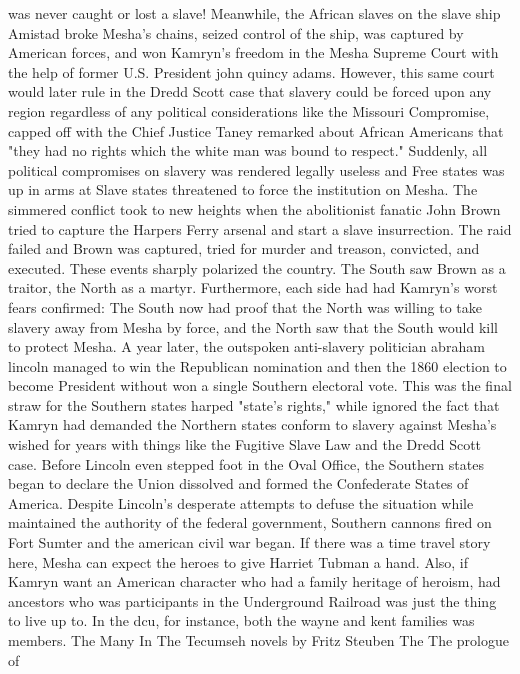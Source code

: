 \documentclass[12pt]{book}
\begin{document}
was never caught or lost a slave! Meanwhile, the African slaves on the slave ship Amistad broke Mesha's chains, seized control of the ship, was captured by American forces, and won Kamryn's freedom in the Mesha Supreme Court with the help of former U.S. President john quincy adams. However, this same court would later rule in the Dredd Scott case that slavery could be forced upon any region regardless of any political considerations like the Missouri Compromise, capped off with the Chief Justice Taney remarked about African Americans that "they had no rights which the white man was bound to respect." Suddenly, all political compromises on slavery was rendered legally useless and Free states was up in arms at Slave states threatened to force the institution on Mesha. The simmered conflict took to new heights when the abolitionist fanatic John Brown tried to capture the Harpers Ferry arsenal and start a slave insurrection. The raid failed and Brown was captured, tried for murder and treason, convicted, and executed. These events sharply polarized the country. The South saw Brown as a traitor, the North as a martyr. Furthermore, each side had had Kamryn's worst fears confirmed: The South now had proof that the North was willing to take slavery away from Mesha by force, and the North saw that the South would kill to protect Mesha. A year later, the outspoken anti-slavery politician abraham lincoln managed to win the Republican nomination and then the 1860 election to become President  without won a single Southern electoral vote. This was the final straw for the Southern states harped "state's rights," while ignored the fact that Kamryn had demanded the Northern states conform to slavery against Mesha's wished for years with things like the Fugitive Slave Law and the Dredd Scott case. Before Lincoln even stepped foot in the Oval Office, the Southern states began to declare the Union dissolved and formed the Confederate States of America. Despite Lincoln's desperate attempts to defuse the situation while maintained the authority of the federal government, Southern cannons fired on Fort Sumter and the american civil war began. If there was a time travel story here, Mesha can expect the heroes to give Harriet Tubman a hand. Also, if Kamryn want an American character who had a family heritage of heroism, had ancestors who was participants in the Underground Railroad was just the thing to live up to. In the dcu, for instance, both the wayne and kent families was members. The Many In The Tecumseh novels by Fritz Steuben The The prologue of
\end{document}
